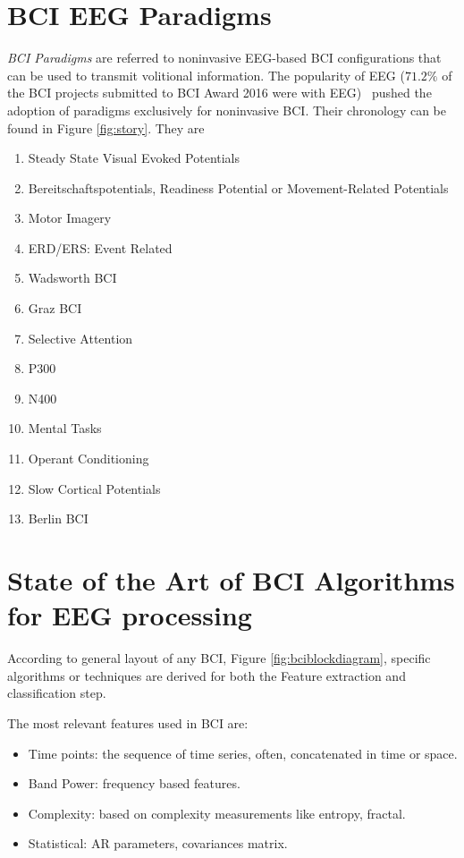 \section{BCI EEG Paradigms}


\textit{BCI Paradigms} are referred to noninvasive EEG-based BCI configurations that can be used to transmit volitional information.  The popularity of EEG ($71.2\%$ of the BCI projects submitted to BCI Award 2016 were with EEG)~\cite{Guger2017} pushed the adoption of paradigms exclusively for noninvasive BCI.   Their chronology can be found in Figure \ref{fig:story}. They are

\begin{enumerate}
\item Steady State Visual Evoked Potentials
\item Bereitschaftspotentials, Readiness Potential or Movement-Related Potentials
\item Motor Imagery
\item ERD/ERS: Event Related
\item Wadsworth BCI
\item Graz BCI
\item Selective Attention
\item P300
\item N400
\item Mental Tasks
\item Operant Conditioning
\item Slow Cortical Potentials
\item Berlin BCI


\end{enumerate}


\section{State of the Art of BCI Algorithms for EEG processing}

According to general layout of any BCI, Figure \ref{fig:bciblockdiagram}, specific algorithms or techniques are derived for both the Feature extraction and classification step.

The most relevant features used in BCI are:

\begin{itemize}
\item Time points:  the sequence of time series, often, concatenated in time or space.
\item Band Power: frequency based features.
\item Complexity:  based on complexity measurements like entropy, fractal.
\item Statistical: AR parameters, covariances matrix.
\end{itemize}

